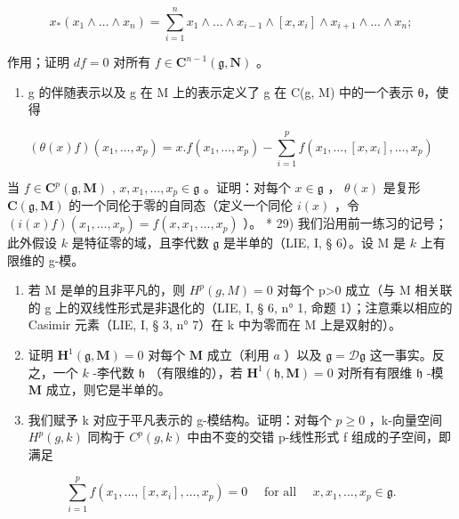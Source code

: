 \[
x _ {*} \left(x _ {1} \wedge \dots \wedge x _ {n}\right) = \sum_ {i = 1} ^ {n} x _ {1} \wedge \dots \wedge x _ {i - 1} \wedge [ x, x _ {i} ] \wedge x _ {i + 1} \wedge \dots \wedge x _ {n};
\]

作用；证明 \(df = 0\) 对所有 \(f \in \mathbf{C}^{n-1}(\mathfrak{g}, \mathbf{N})\) 。

\begin{enumerate}
\def\labelenumi{\alph{enumi})}
\setcounter{enumi}{3}
\tightlist
\item
  g 的伴随表示以及 g 在 M 上的表示定义了 g 在 C(g, M) 中的一个表示 θ，使得
\end{enumerate}

\[
\left(\theta (x) f\right) \left(x _ {1}, \dots , x _ {p}\right) = x. f (x _ {1}, \dots , x _ {p}) - \sum_ {i = 1} ^ {p} f (x _ {1}, \dots , [ x, x _ {i} ], \dots , x _ {p})
\]

当 \(f \in \mathbf{C}^p(\mathfrak{g}, \mathbf{M})\) , \(x, x_1, \ldots, x_p \in \mathfrak{g}\) 。证明：对每个 \(x \in \mathfrak{g}\) ， \(\theta(x)\) 是复形 \(\mathbf{C}(\mathfrak{g}, \mathbf{M})\) 的一个同伦于零的自同态（定义一个同伦 \(i(x)\) ，令 \((i(x) f) (x_1, \ldots, x_p) = f(x, x_1, \ldots, x_p)\) ）。 * 29) 我们沿用前一练习的记号；此外假设 \(k\) 是特征零的域，且李代数 \(\mathfrak{g}\) 是半单的（LIE, I, § 6）。设 M 是 \(k\) 上有限维的 g-模。

\begin{enumerate}
\def\labelenumi{\alph{enumi})}
\item
  若 M 是单的且非平凡的，则 \(H^{p}(g, M)=0\) 对每个 p\textgreater0 成立（与 M 相关联的 g 上的双线性形式是非退化的（LIE, I, § 6, n° 1, 命题 1）；注意乘以相应的 Casimir 元素（LIE, I, § 3, n° 7）在 k 中为零而在 M 上是双射的）。
\item
  证明 \(\mathbf{H}^{1}(\mathfrak{g},\mathbf{M}) = 0\) 对每个 \(\mathbf{M}\) 成立（利用 \(a\) ）以及 \(\mathfrak{g} = \mathcal{D}\mathfrak{g}\) 这一事实。反之，一个 \(k\) -李代数 \(\mathfrak{h}\) （有限维的），若 \(\mathbf{H}^{1}(\mathfrak{h},\mathbf{M}) = 0\) 对所有有限维 \(\mathfrak{h}\) -模 \(\mathbf{M}\) 成立，则它是半单的。
\item
  我们赋予 k 对应于平凡表示的 g-模结构。证明：对每个 \(p \geqslant 0\) ，k-向量空间 \(H^{p}(g, k)\) 同构于 \(C^{p}(g, k)\) 中由不变的交错 p-线性形式 f 组成的子空间，即满足
\end{enumerate}

\[
\sum_ {i = 1} ^ {p} f (x _ {1}, \dots , [ x, x _ {i} ], \dots , x _ {p}) = 0 \quad \text { for   all } \quad x, x _ {1}, \dots , x _ {p} \in \mathfrak {g}.
\]

